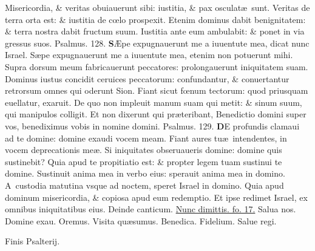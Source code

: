 \documentclass[a5paper,10pt]{book}
\def\ae{æ}
\def\AE{Æ}
\def\oe{œ}
\begin{document}
\begin{multicols*}{2}
\newline \color{red} M\color{black}isericordia, \& veritas obuiauerunt sibi: iustitia, \& pax osculat\ae \ sunt.
\newline \color{red} V\color{black}eritas de terra orta est: \& iustitia de c\oe lo prospexit.
\newline \color{red} E\color{black}tenim dominus dabit benignitatem: \& terra nostra dabit fructum suum.
\newline \color{red} I\color{black}ustitia ante eum ambulabit: \& ponet in via gressus suos. \quad \color{red} Psalmus. \hypertarget{ps128}{128.} \color{black}
\vspace{-.25em}
\lettrine[lines=2]{\bfseries \color{red} S}{}\AE pe expugnauerunt me a iuuentute mea, dicat nunc Israel.
\newline \color{red} S\color{black}\ae pe expugnauerunt me a iuuentute mea, etenim non potuerunt mihi.
\newline \color{red} S\color{black}upra dorsum meum fabricauerunt peccatores: prolongauerunt iniquitatem suam.
\newline \color{red} D\color{black}ominus iustus concidit ceruices peccatorum: confundantur, \& conuertantur retrorsum omnes qui oderunt Sion.
\newline \color{red} F\color{black}iant sicut f\oe num tectorum: quod priusquam euellatur, exaruit.
\newline \color{red} D\color{black}e quo non impleuit manum suam qui metit: \& sinum suum, qui manipulos colligit.
\newline \color{red} E\color{black}t non dixerunt qui pr\ae teribant, Benedictio domini super vos, benediximus vobis in nomine domini. \color{red} Psalmus. \hypertarget{ps129}{129.} \color{black}
\vspace{-1.5em}
\lettrine[lines=2]{\bfseries \color{red} D}{}E profundis clamaui ad te domine: domine exaudi vocem meam.
\newline \color{red} F\color{black}iant aures tu\ae \ intendentes, in vocem deprecationis me\ae .
\newline \color{red} S\color{black}i iniquitates obseruaueris domine: domine quis sustinebit?
\newline \color{red} Q\color{black}uia apud te propitiatio est: \& propter legem tuam sustinui te domine.
\newline \color{red} S\color{black}ustinuit anima mea in verbo eius: sperauit anima mea in domino.
\newline \color{red} A\color{black}\ custodia matutina vsque ad noctem, speret Israel in domino.
\newline \color{red} Q\color{black}uia apud dominum misericordia, \& copiosa apud eum redemptio.
\newline \color{red} E\color{black}t ipse redimet Israel, ex omnibus iniquitatibus eius.
\newline \color{red} Deinde canticum. \color{black} \hyperlink{Nunc}{Nunc dimittis. fo. 17.} Salua nos. Domine exau. Oremus. Visita qu\ae sumus. Benedica. Fidelium. Salue regi.
\begin{center} \color{red}
Finis Psalterij.
\end{center}
\end{multicols*}
\end{document}
